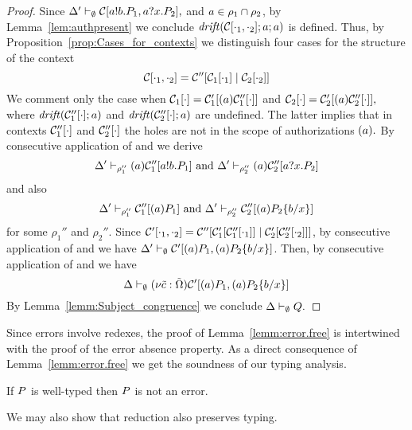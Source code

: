 \begin{proof}
Since $ \Delta'\vdash_\emptyset \mathcal{C}[a!b.P_1, a?x.P_2],$ and $a\in\rho_1\cap\rho_2$, by Lemma~\ref{lem:authpresent} we conclude
 $\mathit {drift}(\mathcal{C}[\cdot_1,\cdot_2];a;a)$ is defined.
%
Thus, by Proposition~\ref{prop:Cases_for_contexts} we distinguish four cases for the structure of the context 
\[
\mathcal{C}[\cdot_1, \cdot_2]=\mathcal{C}''[\mathcal{C}_1[\cdot_1] \;|\; \mathcal{C}_2[\cdot_2]]
\] 
We comment only the case when $\mathcal{C}_1[\cdot]=\mathcal{C}_1'[(a) \mathcal{C}_1''[\cdot]]$ and $\mathcal{C}_2[\cdot]=\mathcal{C}_2'[(a) \mathcal{C}_2''[\cdot]],$ where $\mathit {drift}(\mathcal{C}_1''[\cdot]; a)$ and $\mathit {drift}(\mathcal{C}_2''[\cdot]; a)$ are undefined.  The latter implies that in contexts $\mathcal{C}_1''[\cdot]$ and $\mathcal{C}_2''[\cdot]$ the holes are not in the scope of authorizations $(a).$  
By consecutive application of  and  we derive 
\[ 
\Delta' \vdash_{\rho_1''} (a) \mathcal{C}_1''[a!b.P_1] \text{ and } \Delta' \vdash_{\rho_2''} (a) \mathcal{C}_2''[a?x.P_2]
\] 
and also 
\[ 
\Delta' \vdash_{\rho_1''}  \mathcal{C}_1''[(a)P_1] \text{ and } \Delta' \vdash_{\rho_2''}  \mathcal{C}_2''[(a)P_2\{b/x\}]
\] 
for some $ \rho_1''$ and $\rho_2''.$ 
Since $\mathcal{C}'[\cdot_1, \cdot_2]=\mathcal{C}''[\mathcal{C}_1'[\mathcal{C}_1''[\cdot_1]] \;|\; \mathcal{C}_2'[\mathcal{C}_2''[\cdot_2]]]$, by consecutive application of  and  we have $\Delta'\vdash_\emptyset \mathcal{C}'[(a)P_1, (a)P_2\{b/x\}]$. Then, by consecutive application of  and  we have 
\[
\Delta\vdash_\emptyset (\nu \tilde{c}: \tilde{\Omega})\mathcal{C}'[(a)P_1, (a)P_2\{b/x\}]
\]
By Lemma~\ref{lemm:Subject_congruence} we conclude $\Delta\vdash_\emptyset Q.$
\end{proof}

Since errors involve redexes, the proof of Lemma~\ref{lemm:error.free} is intertwined with the proof of the error absence property. As a direct consequence of Lemma~\ref{lemm:error.free} we get the soundness of our typing analysis.


\begin{proposition}\label{lemm:error.freedom}
If $P$ is well-typed then $P$ is not an error.
\end{proposition}
%
We may also show that reduction also preserves typing. 

